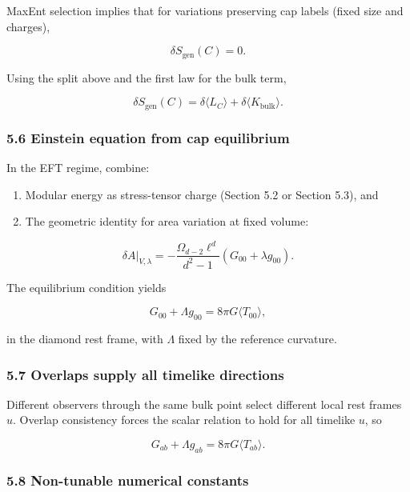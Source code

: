 \documentclass[
]{article}
\providecommand{\tightlist}{%
  \setlength{\itemsep}{0pt}\setlength{\parskip}{0pt}}
\begin{document}
MaxEnt selection implies that for variations preserving cap labels
(fixed size and charges),

\[
\delta S_{\mathrm{gen}}(C) = 0.
\]

Using the split above and the first law for the bulk term,

\[
\delta S_{\mathrm{gen}}(C) = \delta \langle L_C \rangle + \delta \langle K_{\mathrm{bulk}} \rangle.
\]

\subsubsection{5.6 Einstein equation from cap
equilibrium}\label{einstein-equation-from-cap-equilibrium}

In the EFT regime, combine:

\begin{enumerate}
\def\labelenumi{\arabic{enumi})}
\tightlist
\item
  Modular energy as stress-tensor charge (Section 5.2 or Section 5.3),
  and
\item
  The geometric identity for area variation at fixed volume:
\end{enumerate}

\[
\delta A|_{V,\lambda} = -\frac{\Omega_{d-2} \ell^d}{d^2 - 1} (G_{00} + \lambda g_{00}).
\]

The equilibrium condition yields

\[
G_{00} + \Lambda g_{00} = 8 \pi G \langle T_{00} \rangle,
\]

in the diamond rest frame, with \(\Lambda\) fixed by the reference
curvature.

\subsubsection{5.7 Overlaps supply all timelike
directions}\label{overlaps-supply-all-timelike-directions}

Different observers through the same bulk point select different local
rest frames \(u\). Overlap consistency forces the scalar relation to
hold for all timelike \(u\), so

\[
G_{ab} + \Lambda g_{ab} = 8 \pi G \langle T_{ab} \rangle.
\]

\subsubsection{5.8 Non-tunable numerical
constants}\label{non-tunable-numerical-constants}
\end{document}
